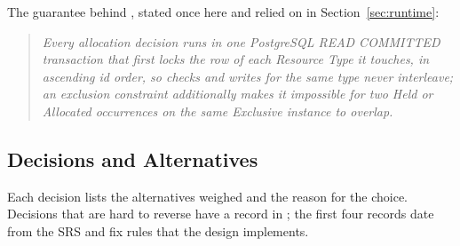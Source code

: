 The guarantee behind , stated once here and relied on in Section~\ref{sec:runtime}:
\begin{quote}
\emph{Every allocation decision runs in one PostgreSQL READ COMMITTED transaction that first locks the row of each Resource Type it touches, in ascending id order, so checks and writes for the same type never interleave; an exclusion constraint additionally makes it impossible for two Held or Allocated occurrences on the same Exclusive instance to overlap.}
\end{quote}

\subsection{Decisions and Alternatives}

Each decision lists the alternatives weighed and the reason for the choice. Decisions that are hard to reverse have a record in ; the first four records date from the SRS and fix rules that the design implements.

